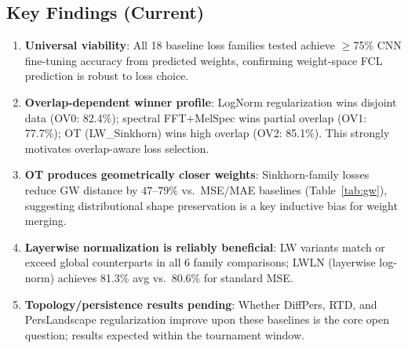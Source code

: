 \subsection{Key Findings (Current)}

\begin{enumerate}
    \item \textbf{Universal viability}: All 18 baseline loss families tested achieve $\geq$75\% CNN fine-tuning accuracy from predicted weights, confirming weight-space FCL prediction is robust to loss choice.

    \item \textbf{Overlap-dependent winner profile}: LogNorm regularization wins disjoint data (OV0: 82.4\%); spectral FFT+MelSpec wins partial overlap (OV1: 77.7\%); OT (LW\_Sinkhorn) wins high overlap (OV2: 85.1\%). This strongly motivates overlap-aware loss selection.

    \item \textbf{OT produces geometrically closer weights}: Sinkhorn-family losses reduce GW distance by $47$--$79\%$ vs.\ MSE/MAE baselines (Table~\ref{tab:gw}), suggesting distributional shape preservation is a key inductive bias for weight merging.

    \item \textbf{Layerwise normalization is reliably beneficial}: LW variants match or exceed global counterparts in all 6 family comparisons; LWLN (layerwise log-norm) achieves 81.3\% avg vs.\ 80.6\% for standard MSE.

    \item \textbf{Topology/persistence results pending}: Whether DiffPers, RTD, and PersLandscape regularization improve upon these baselines is the core open question; results expected within the tournament window.
\end{enumerate}
